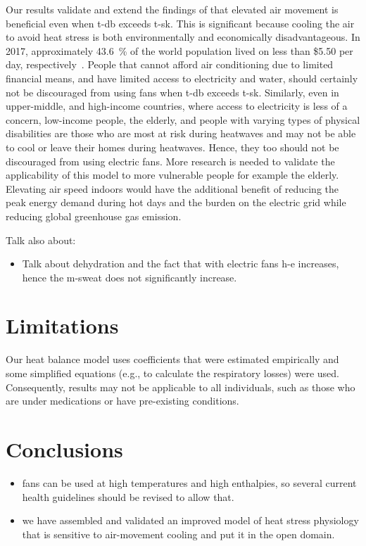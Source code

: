 Our results validate and extend the findings of  that elevated air movement is beneficial even when \ac{t-db} exceeds \acf{t-sk}.
This is significant because cooling the air to avoid heat stress is both environmentally and economically disadvantageous.
In 2017, approximately 43.6~\% of the world population lived on less than \$5.50 per day, respectively~\cite{PovertyO1:online}.
People that cannot afford air conditioning due to limited financial means, and have limited access to electricity and water, should certainly not be discouraged from using fans when \ac{t-db} exceeds \ac{t-sk}.
Similarly, even in upper-middle, and high-income countries, where access to electricity is less of a concern, low-income people, the elderly, and people with varying types of physical disabilities are those who are most at risk during heatwaves and may not be able to cool or leave their homes during heatwaves.
Hence, they too should not be discouraged from using electric fans.
More research is needed to validate the applicability of this model to more vulnerable people for example the elderly.
Elevating air speed indoors would have the additional benefit of reducing the peak energy demand during hot days and the burden on the electric grid while reducing global greenhouse gas emission.

Talk also about:
\begin{itemize}
    \item Talk about dehydration and the fact that with electric fans \ac{h-e} increases, hence the \ac{m-sweat} does not significantly increase.
\end{itemize}

\section*{Limitations}
Our heat balance model uses coefficients that were estimated empirically and some simplified equations (e.g., to calculate the respiratory losses) were used.
Consequently, results may not be applicable to all individuals, such as those who are under medications or have pre-existing conditions.

\section{Conclusions}\label{sec:conclusions}
\begin{itemize}
    \item fans can be used at high temperatures and high enthalpies, so several current health guidelines should be revised to allow that.
    \item we have assembled and validated an improved model of heat stress physiology that is sensitive to air-movement cooling and put it in the open domain.
\end{itemize}



